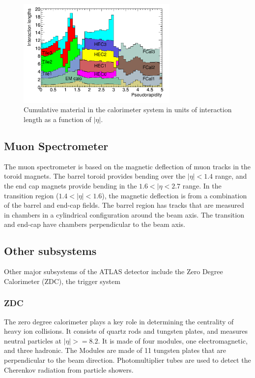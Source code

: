 \begin{figure}[ht]
	\centering
        \includegraphics[width=0.7\textwidth]{figures/setup/interaction_lengths}
          \caption{Cumulative material in the calorimeter system in units of interaction length as a function of $|\eta|$.}
          \label{fig:interaction_lenghts}
\end{figure}

\subsection{Muon Spectrometer}
The muon spectrometer is based on the magnetic deflection of muon tracks in the toroid magnets. The barrel toroid provides bending over the $|\eta| < 1.4$ range, and the end cap magnets provide bending in the $1.6 < |\eta < 2.7$ range. In the transition region ($1.4 < |\eta| < 1.6$), the magnetic deflection is from a combination of the barrel and end-cap fields. The barrel region has tracks that are measured in chambers in a cylindrical configuration around the beam axis. The transition and end-cap have chambers perpendicular to the beam axis. 


\subsection{Other subsystems}
Other major subsystems of the ATLAS detector include the Zero Degree Calorimeter (ZDC), the trigger system

\subsubsection{ZDC}
The zero degree calorimeter plays a key role in determining the centrality of heavy ion collisions. It consists of quartz rods and tungsten plates, and measures neutral particles at $|\eta| >= 8.2$. It is made of four modules, one electromagnetic, and three hadronic. The Modules are made of 11 tungsten plates that are perpendicular to the beam direction. Photomultiplier tubes are used to detect the Cherenkov radiation from particle showers.


